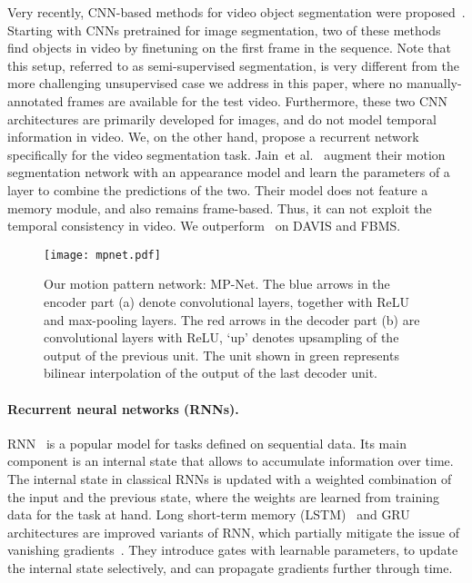 Very recently, CNN-based methods for video object segmentation were
proposed~\cite{Caelles17,Khoreva16,jain2017fusionseg}. Starting with CNNs
pretrained for image segmentation, two of these
methods~\cite{Caelles17,Khoreva16} find objects in video by finetuning on the
first frame in the sequence. Note that this setup, referred to as
semi-supervised segmentation, is very different from the more challenging
unsupervised case we address in this paper, where no manually-annotated frames
are available for the test video. Furthermore, these two CNN architectures are
primarily developed for images, and do not model temporal information in video.
We, on the other hand, propose a recurrent network specifically for the video
segmentation task. Jain~et al.~\cite{jain2017fusionseg} augment their motion
segmentation network with an appearance model and learn the parameters of a
layer to combine the predictions of the two. Their model does not feature a
memory module, and also remains frame-based. Thus, it can not exploit the
temporal consistency in video. We outperform~\cite{jain2017fusionseg} on DAVIS
and FBMS.
\begin{figure*}[t]
\begin{center}
\texttt{[image: mpnet.pdf]}
\end{center}
\caption{Our motion pattern network: MP-Net. The blue arrows in the encoder
part (a) denote convolutional layers, together with ReLU and max-pooling
layers. The red arrows in the decoder part (b) are convolutional layers with
ReLU, `up' denotes  upsampling of the output of the previous unit.
The unit shown in green represents bilinear interpolation of the output of the
last decoder unit. }
\label{fig:mpnet}
\end{figure*}

\paragraph{\bf Recurrent neural networks (RNNs).}
RNN~\cite{hopfield1982neural,rumelhart86} is a popular model for tasks defined
on sequential data. Its main component is an internal state that allows to
accumulate information over time. The internal state in classical RNNs is
updated with a weighted combination of the input and the previous state, where
the weights are learned from training data for the task at hand. Long
short-term memory (LSTM)~\cite{hochreiter1997long} and GRU~\cite{Cho14}
architectures are improved variants of RNN, which partially mitigate the issue
of vanishing gradients~\cite{pascanu2013difficulty,Hochreiter98}. They
introduce gates with learnable parameters, to update the internal state
selectively, and can propagate gradients further through time.


